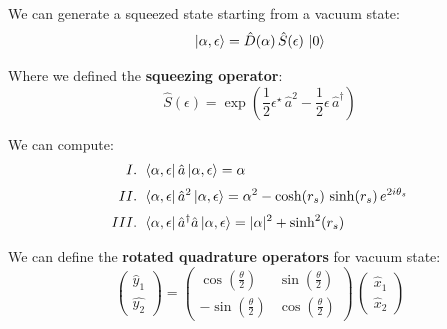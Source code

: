 We can generate a squeezed state starting from a vacuum state:
\begin{equation}\label{eqn:13-squeezed-state-generation}
\ket{\alpha,\epsilon} = \hat{D}(\alpha) \, \hat{S}(\epsilon) \, \ket{0}
\end{equation}

Where we defined the \textbf{squeezing operator}:
\begin{equation}\label{eqn:13-squeezing-operator}
    \hat{S}(\epsilon) = 
    \exp{
    \left(
        \frac{1}{2}\epsilon^\star\,\hat{a}^2 -
        \frac{1}{2}\epsilon\,\hat{a}^\dagger 
    \right)}
\end{equation}

We can compute:
\begin{align}\label{eqn:13-squeezed-state-expectation-values}
    \Rnum{1}&.\hspace{1ex}
    \bra{\alpha,\epsilon} \hat{a} \ket{\alpha,\epsilon} = \alpha\\[0.5ex]
    \Rnum{2}&.\hspace{1ex}
    \bra{\alpha,\epsilon} \hat{a}^2 \ket{\alpha,\epsilon} = \alpha^2-\cosh(r_s)\, \sinh(r_s)\, e^{2i\theta_s}\\[0.5ex]
    \Rnum{3}&.\hspace{1ex}
    \bra{\alpha,\epsilon} \hat{a}^\dagger \hat{a} \ket{\alpha,\epsilon} = |\alpha|^2+\sinh^2(r_s)
\end{align}


We can define the \textbf{rotated quadrature operators} for vacuum state:
\begin{equation}\label{eqn:13-rotated-quadrature-operator-squeezed}
\begin{pmatrix}
    \hat{y}_1\\[0.5ex]
    \hat{y_2}
\end{pmatrix} = 
\begin{pmatrix}
    \cos (\tfrac{\theta}{2}) &\sin(\tfrac{\theta}{2})\\[0.5ex]
    -\sin(\tfrac{\theta}{2}) &\cos(\tfrac{\theta}{2})
\end{pmatrix} 
\, 
\begin{pmatrix}
    \hat{x}_1\\[0.5ex]
    \hat{x}_2
\end{pmatrix}
\end{equation}

